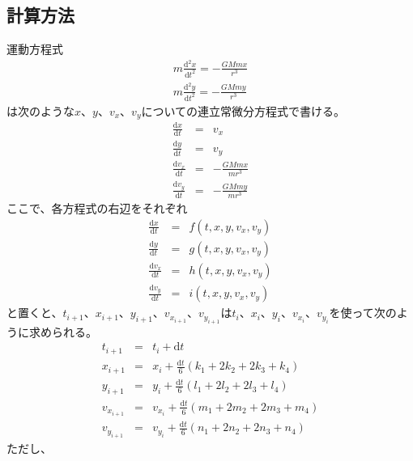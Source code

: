 \documentclass[a4paper,twoside]{jarticle}
\begin{document}
\subsection{計算方法}
運動方程式
\begin{eqnarray}
  m\frac{\mathrm{d}^2 x}{\mathrm{d}t^2}=-\frac{GMmx}{r^3}\\
  m\frac{\mathrm{d}^2 y}{\mathrm{d}t^2}=-\frac{GMmy}{r^3}
\end{eqnarray}
は次のような$x$、$y$、$v_x$、$v_y$についての連立常微分方程式で書ける。
\begin{eqnarray}
  \frac{\mathrm{d}x}{\mathrm{d}t}&=&v_x\\
  \frac{\mathrm{d}y}{\mathrm{d}t}&=&v_y\\
  \frac{\mathrm{d}v_x}{\mathrm{d}t}&=&-\frac{GMmx}{mr^3}\\
  \frac{\mathrm{d}v_y}{\mathrm{d}t}&=&-\frac{GMmy}{mr^3}
\end{eqnarray}
ここで、各方程式の右辺をそれぞれ
\begin{eqnarray}
  \frac{\mathrm{d}x}{\mathrm{d}t}&=&f\left(t,x,y,v_x,v_y\right)\\
  \frac{\mathrm{d}y}{\mathrm{d}t}&=&g\left(t,x,y,v_x,v_y\right)\\
  \frac{\mathrm{d}v_x}{\mathrm{d}t}&=&h\left(t,x,y,v_x,v_y\right)\\
  \frac{\mathrm{d}v_y}{\mathrm{d}t}&=&i\left(t,x,y,v_x,v_y\right)
\end{eqnarray}
と置くと、$t_{i+1}$、$x_{i+1}$、$y_{i+1}$、$v_{x_{i+1}}$、$v_{y_{i+1}}$は$t_{i}$、$x_{i}$、$y_{i}$、$v_{x_{i}}$、$v_{y_{i}}$を使って次のように求められる。
\begin{eqnarray}
  t_{i+1}&=&t_{i}+\mathrm{d}t\\
  x_{i+1}&=&x_{i}+\frac{\mathrm{d}t}{6}\left(k_1+2k_2+2k_3+k_4\right)\\
  y_{i+1}&=&y_{i}+\frac{\mathrm{d}t}{6}\left(l_1+2l_2+2l_3+l_4\right)\\
  v_{x_{i+1}}&=&v_{x_{i}}+\frac{\mathrm{d}t}{6}\left(m_1+2m_2+2m_3+m_4\right)\\
  v_{y_{i+1}}&=&v_{y_{i}}+\frac{\mathrm{d}t}{6}\left(n_1+2n_2+2n_3+n_4\right)
\end{eqnarray}
ただし、
\tiny
\end{document}
